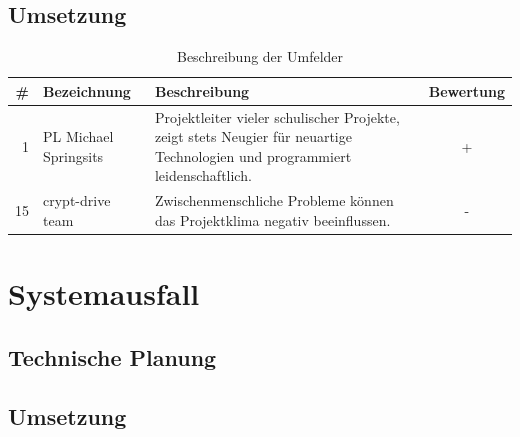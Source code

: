   \subsection{Umsetzung}


\begin{table}[H]
\centering
\begin{tabular}{|r|l|p{7cm}|c|}
\hline \# & Bezeichnung & Beschreibung & Bewertung \\\hline
\hline 1 & PL Michael Springsits & Projektleiter vieler schulischer Projekte, zeigt stets Neugier für neuartige Technologien und programmiert leidenschaftlich. & + \\
\hline 15 & crypt-drive team & Zwischenmenschliche Probleme können das Projektklima negativ beeinflussen.  & - \\\hline
\end{tabular}
\caption{Beschreibung der Umfelder}
\end{table}




\section{Systemausfall}

  \subsection{Technische Planung}

  \subsection{Umsetzung}

